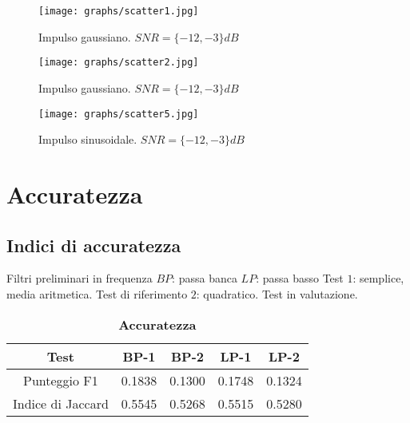 \documentclass[9pt,twocolumn,twoside]{osajnl}
\begin{document}
\begin{figure}[htbp]
\centering
\texttt{[image: graphs/scatter1.jpg]}
\caption{Impulso gaussiano. $SNR= \{-12,-3\}dB$}
\label{fig:scatter1}
\end{figure}



\begin{figure}[htbp]
\centering
\texttt{[image: graphs/scatter2.jpg]}
\caption{Impulso gaussiano. $SNR= \{-12,-3\}dB$}
\label{fig:scatter2}
\end{figure}


\begin{figure}[htbp]
\centering
\texttt{[image: graphs/scatter5.jpg]}
\caption{Impulso sinusoidale. $SNR= \{-12,-3\}dB$}
\label{fig:scatter5}
\end{figure}



\section{Accuratezza}
\label{accuratezza}


\subsection{Indici di accuratezza}
\label{indici}
Filtri preliminari in frequenza
$BP$: passa banca 
$LP$: passa basso
Test
$1$: semplice, media aritmetica. Test di riferimento
$2$: quadratico. Test in valutazione.

\begin{table}[htbp]
\centering
\caption{\bf Accuratezza}
\begin{tabular}{ccccc}
\hline
Test                & BP-1 & BP-2 & LP-1 & LP-2 \\
\hline
Punteggio F1        & 0.1838    &0.1300    &0.1748    &0.1324\\
Indice di Jaccard   & 0.5545    &0.5268    &0.5515    &0.5280 \\
\hline
\end{tabular}
\label{tab:indici}
\end{table}
\end{document}
